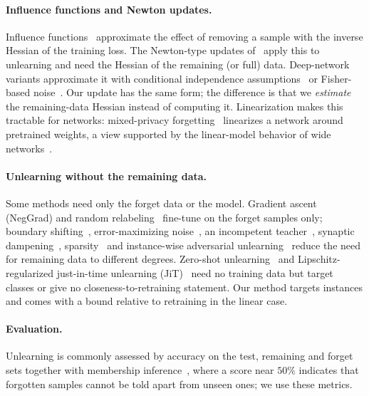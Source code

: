 \documentclass[10pt,twocolumn,letterpaper]{article}
\begin{document}
\paragraph{Influence functions and Newton updates.}
Influence functions~\cite{koh2017} approximate the effect of removing a sample with the inverse Hessian of the training loss.
The Newton-type updates of~\cite{guo2020,sekhari2021,warnecke2023} apply this to unlearning and need the Hessian of the remaining (or full) data.
Deep-network variants approximate it with conditional independence assumptions~\cite{mehta2022} or Fisher-based noise~\cite{golatkar2020eternal,golatkar2020forgetting}.
Our update has the same form; the difference is that we \emph{estimate} the remaining-data Hessian instead of computing it.
Linearization makes this tractable for networks: mixed-privacy forgetting~\cite{golatkar2021mixed} linearizes a network around pretrained weights, a view supported by the linear-model behavior of wide networks~\cite{jacot2018,lee2019wide}.

\paragraph{Unlearning without the remaining data.}
Some methods need only the forget data or the model.
Gradient ascent (NegGrad) and random relabeling~\cite{golatkar2020eternal,graves2021,kurmanji2023} fine-tune on the forget samples only; boundary shifting~\cite{chen2023boundary}, error-maximizing noise~\cite{tarun2023fast}, an incompetent teacher~\cite{chundawat2023bad}, synaptic dampening~\cite{foster2024ssd}, sparsity~\cite{jia2023sparsity} and instance-wise adversarial unlearning~\cite{cha2024} reduce the need for remaining data to different degrees.
Zero-shot unlearning~\cite{chundawat2023zeroshot} and Lipschitz-regularized just-in-time unlearning (JiT)~\cite{foster2024jit} need no training data but target classes or give no closeness-to-retraining statement.
Our method targets instances and comes with a bound relative to retraining in the linear case.

\paragraph{Evaluation.}
Unlearning is commonly assessed by accuracy on the test, remaining and forget sets together with membership inference~\cite{shokri2017}, where a score near $50\%$ indicates that forgotten samples cannot be told apart from unseen ones; we use these metrics.
\end{document}
